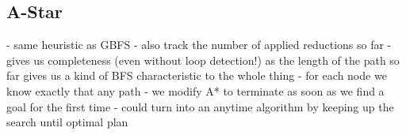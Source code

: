 \subsection{A-Star}
- same heuristic as GBFS
- also track the number of applied reductions so far
- gives us completeness (even without loop detection!) as the length of the path so far gives us a kind of BFS characteristic to the whole thing
- for each node we know exactly that any path
- we modify A* to terminate as soon as we find a goal for the first time
- could turn into an anytime algorithm by keeping up the search until optimal plan
